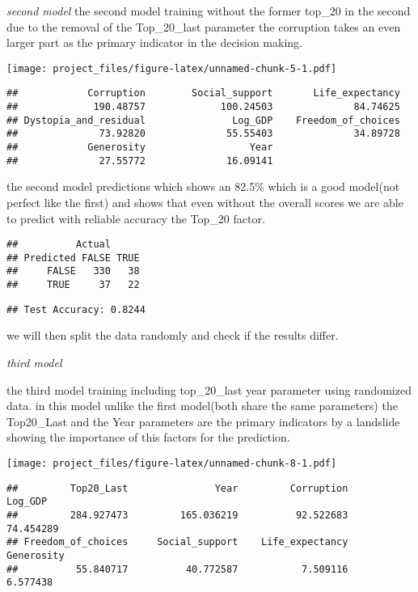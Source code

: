 \documentclass[
]{article}
\begin{document}
\emph{second model} the second model training without the former top\_20
in the second due to the removal of the Top\_20\_last parameter the
corruption takes an even larger part as the primary indicator in the
decision making.

\texttt{[image: project\_files/figure-latex/unnamed-chunk-5-1.pdf]}

\begin{verbatim}
##            Corruption        Social_support       Life_expectancy 
##             190.48757             100.24503              84.74625 
## Dystopia_and_residual               Log_GDP    Freedom_of_choices 
##              73.92820              55.55403              34.89728 
##            Generosity                  Year 
##              27.55772              16.09141
\end{verbatim}

the second model predictions which shows an 82.5\% which is a good
model(not perfect like the first) and shows that even without the
overall scores we are able to predict with reliable accuracy the Top\_20
factor.

\begin{verbatim}
##          Actual
## Predicted FALSE TRUE
##     FALSE   330   38
##     TRUE     37   22
\end{verbatim}

\begin{verbatim}
## Test Accuracy: 0.8244
\end{verbatim}

we will then split the data randomly and check if the results differ.

\emph{third model}

the third model training including top\_20\_last year parameter using
randomized data. in this model unlike the first model(both share the
same parameters) the Top20\_Last and the Year parameters are the primary
indicators by a landslide showing the importance of this factors for the
prediction.

\texttt{[image: project\_files/figure-latex/unnamed-chunk-8-1.pdf]}

\begin{verbatim}
##         Top20_Last               Year         Corruption            Log_GDP 
##         284.927473         165.036219          92.522683          74.454289 
## Freedom_of_choices     Social_support    Life_expectancy         Generosity 
##          55.840717          40.772587           7.509116           6.577438
\end{verbatim}
\end{document}
